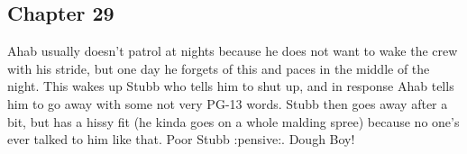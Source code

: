 \subsection{Chapter 29}

Ahab usually doesn't patrol at nights because he does not want to wake the crew
with his stride, but one day he forgets of this and paces in the middle of the
night. This wakes up Stubb who tells him to shut up, and in response Ahab tells
him to go away with some not very PG-13 words. Stubb then goes away after a
bit, but has a hissy fit (he kinda goes on a whole malding spree) because no
one's ever talked to him like that. Poor Stubb :pensive:. Dough Boy!
